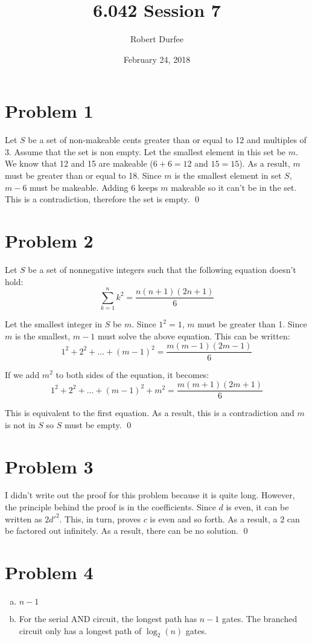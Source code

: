 \documentclass{article}
\title{ 6.042 Session 7 }
\author{ Robert Durfee }
\date{ February 24, 2018 }
\begin{document}
\maketitle

\section*{Problem 1}

Let $S$ be a set of non-makeable cents greater than or equal to 12 and multiples of
3. Assume that the set is non empty. Let the smallest element in this set be
$m$. We know that 12 and 15 are makeable ($6 + 6 = 12$ and $15 = 15$). As a
result, $m$ must be greater than or equal to 18. Since $m$ is the smallest
element in set $S$, $m - 6$ must be makeable. Adding $6$ keeps $m$ makeable so
it can't be in the set. This is a contradiction, therefore the set is empty.
\qed

\section*{Problem 2}

Let $S$ be a set of nonnegative integers such that the following equation
doesn't hold:
$$ \sum\limits_{k=1}^{n} k^{2} = \frac{ n (n + 1) (2n + 1) }{ 6 } $$

Let the smallest integer in $S$ be $m$. Since $1^{2} = 1$, $m$ must be greater
than 1. Since $m$ is the smallest, $m - 1$ must solve the above equation. This
can be written:
$$ 1^{2} + 2^{2} + \ldots + (m - 1)^{2} = \frac{ m (m - 1) (2m - 1) }{ 6 } $$

If we add $m^{2}$ to both sides of the equation, it becomes:
$$ 1^{2} + 2^{2} + \ldots + (m - 1)^{2} + m^{2} = \frac{ m (m + 1) (2m + 1) }{ 6 } $$

This is equivalent to the first equation. As a result, this is a contradiction
and $m$ is not in $S$ so $S$ must be empty. \qed

\section*{Problem 3}

I didn't write out the proof for this problem because it is quite long. However,
the principle behind the proof is in the coefficients. Since $d$ is even, it can
be written as $2 d'^{2}$. This, in turn, proves $c$ is even and so forth. As a
result, a $2$ can be factored out infinitely. As a result, there can be no
solution. \qed

\section*{Problem 4}

\begin{enumerate}[a.]
  \item $n - 1$
  \item For the serial AND circuit, the longest path has $n - 1$ gates. The
    branched circuit only has a longest path of $\log_{2}(n)$ gates.
\end{enumerate}
\end{document}
